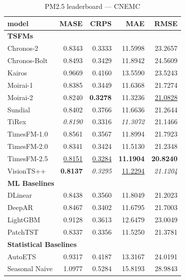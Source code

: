 \begin{table}[H]
\caption{PM2.5 leaderboard --- CNEMC}
\centering
\begin{small}
\begin{tabular}{lrrrr}
\toprule
model & MASE & CRPS & MAE & RMSE \\
\midrule
\multicolumn{5}{l}{\textbf{TSFMs}} \\
Chronos-2 & 0.8343 & 0.3333 & 11.5998 & 23.2657 \\
Chronos-Bolt & 0.8493 & 0.3429 & 11.8942 & 24.5609 \\
Kairos & 0.9669 & 0.4160 & 13.5590 & 23.5243 \\
Moirai-1 & 0.8385 & 0.3449 & 11.6368 & 21.7274 \\
Moirai-2 & 0.8240 & \textbf{0.3278} & 11.3236 & \underline{21.0828} \\
Sundial & 0.8402 & 0.3766 & 11.6636 & 21.2644 \\
TiRex & \textit{0.8190} & 0.3316 & \textit{11.3072} & 21.1466 \\
TimesFM-1.0 & 0.8561 & 0.3567 & 11.8994 & 21.7923 \\
TimesFM-2.0 & 0.8341 & 0.3424 & 11.5130 & 21.2348 \\
TimesFM-2.5 & \underline{0.8151} & \underline{0.3284} & \textbf{11.1904} & \textbf{20.8240} \\
VisionTS++ & \textbf{0.8137} & \textit{0.3295} & \underline{11.2294} & \textit{21.1204} \\
\midrule
\multicolumn{5}{l}{\textbf{ML Baselines}} \\
DLinear & 0.8438 & 0.3560 & 11.8049 & 21.2023 \\
DeepAR & 0.8467 & 0.3402 & 11.6795 & 21.7003 \\
LightGBM & 0.9128 & 0.3613 & 12.6479 & 23.0049 \\
PatchTST & 0.8337 & 0.3356 & 11.5250 & 21.3781 \\
\midrule
\multicolumn{5}{l}{\textbf{Statistical Baselines}} \\
AutoETS & 0.9317 & 0.4187 & 13.3167 & 24.0191 \\
Seasonal Naive & 1.0977 & 0.5284 & 15.8193 & 28.9843 \\
\bottomrule
\end{tabular}
\end{small}
\end{table}